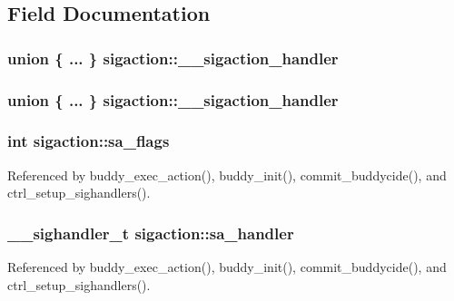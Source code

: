\subsection{Field Documentation}
\subsubsection[{\_\-\_\-sigaction\_\-handler}]{\setlength{\rightskip}{0pt plus 5cm}union \{ ... \} 
     {\bf sigaction::\_\-\_\-sigaction\_\-handler}}\label{structsigaction_af7546947a65ae0c56c5db530fbc31159}
\subsubsection[{\_\-\_\-sigaction\_\-handler}]{\setlength{\rightskip}{0pt plus 5cm}union \{ ... \}   {\bf sigaction::\_\-\_\-sigaction\_\-handler}}\label{structsigaction_a4039498d31a1ed3720510748f2ff2b5e}
\subsubsection[{sa\_\-flags}]{\setlength{\rightskip}{0pt plus 5cm}int {\bf sigaction::sa\_\-flags}}\label{structsigaction_aea0dabe7a03641c8b426521f4406b425}


Referenced by buddy\_\-exec\_\-action(), buddy\_\-init(), commit\_\-buddycide(), and ctrl\_\-setup\_\-sighandlers().

\subsubsection[{sa\_\-handler}]{\setlength{\rightskip}{0pt plus 5cm}\_\-\_\-sighandler\_\-t {\bf sigaction::sa\_\-handler}}\label{structsigaction_a758a699ea5845e043e3ff61df1b59de8}


Referenced by buddy\_\-exec\_\-action(), buddy\_\-init(), commit\_\-buddycide(), and ctrl\_\-setup\_\-sighandlers().

